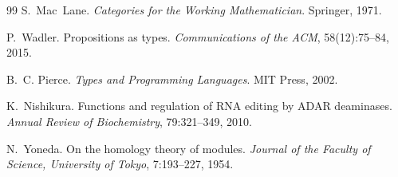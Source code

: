 \documentclass[12pt,a4paper]{article}
\theoremstyle{definition}
\begin{document}
\begin{thebibliography}{99}
S.~Mac~Lane.
\newblock \emph{Categories for the Working Mathematician}.
\newblock Springer, 1971.

P.~Wadler.
\newblock Propositions as types.
\newblock \emph{Communications of the ACM}, 58(12):75--84, 2015.

B.~C. Pierce.
\newblock \emph{Types and Programming Languages}.
\newblock MIT Press, 2002.

K.~Nishikura.
\newblock Functions and regulation of RNA editing by ADAR deaminases.
\newblock \emph{Annual Review of Biochemistry}, 79:321--349, 2010.

N.~Yoneda.
\newblock On the homology theory of modules.
\newblock \emph{Journal of the Faculty of Science, University of Tokyo},
  7:193--227, 1954.

\end{thebibliography}
\end{document}
